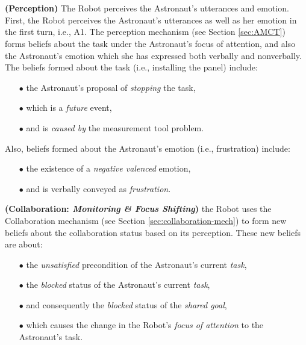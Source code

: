 \noindent{}\\ \\

\noindent \textbf{(Perception)} The Robot perceives the Astronaut's utterances
and emotion.\\
  
First, the Robot perceives the Astronaut's utterances as well as her emotion in
the first turn, i.e., A1. The perception mechanism (see Section \ref{sec:AMCT})
forms beliefs about the task under the Astronaut's focus of attention, and also
the Astronaut's emotion which she has expressed both verbally and nonverbally.
The beliefs formed about the task (i.e., installing the panel) include:

\begin{itemize}
  \item[$\bullet$] the Astronaut's proposal of \textit{stopping} the task,
  \item[$\bullet$] which is a \textit{future} event,
  \item[$\bullet$] and is \textit{caused by} the measurement tool problem.
\end{itemize}

\noindent Also, beliefs formed about the Astronaut's emotion (i.e., frustration)
include:

\begin{itemize}
  \item[$\bullet$] the existence of a \textit{negative valenced} emotion,
  \item[$\bullet$] and is verbally conveyed as \textit{frustration}.\\
\end{itemize}

\noindent\textbf{(Collaboration: \textit{Monitoring \& Focus Shifting})}
the Robot uses the Collaboration mechanism (see Section
\ref{sec:collaboration-mech}) to form new beliefs about the collaboration status
based on its perception. These new beliefs are about:

\begin{itemize}
  \item[$\bullet$] the \textit{unsatisfied} precondition of the Astronaut's
  current \textit{task},
  \item[$\bullet$] the \textit{blocked} status of the Astronaut's current
  \textit{task},
  \item[$\bullet$] and consequently the \textit{blocked} status of the
  \textit{shared goal},
  \item[$\bullet$] which causes the change in the Robot's \textit{focus of
  attention} to the Astronaut's task.
\end{itemize}

